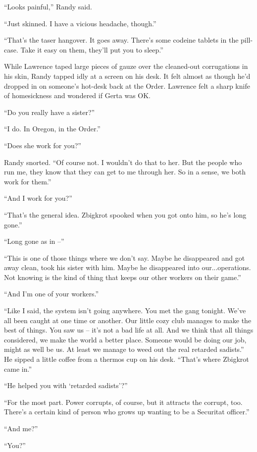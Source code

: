 “Looks painful,” Randy said.

“Just skinned. I have a vicious headache, though.”

“That's the taser hangover. It goes away. There's some codeine 
tablets in the pill-case. Take it easy on them, they'll put you to 
sleep.”

While Lawrence taped large pieces of gauze over the cleaned-out 
corrugations in his skin, Randy tapped idly at a screen on his desk. It 
felt almost as though he'd dropped in on someone's hot-desk back at the 
Order. Lawrence felt a sharp knife of homesickness and wondered if 
Gerta was OK.

“Do you really have a sister?”

“I do. In Oregon, in the Order.”

“Does she work for you?”

Randy snorted. “Of course not. I wouldn't do that to her. But the 
people who run me, they know that they can get to me through her. So in 
a sense, we both work for them.”

“And I work for you?”

“That's the general idea. Zbigkrot spooked when you got onto him, so 
he's long gone.”

“Long gone as in --”

“This is one of those things where we don't say. Maybe he disappeared 
and got away clean, took his sister with him. Maybe he disappeared into 
our...operations. Not knowing is the kind of thing that keeps our other 
workers on their game.”

“And I'm one of your workers.”

“Like I said, the system isn't going anywhere. You met the gang 
tonight. We've all been caught at one time or another. Our little cozy 
club manages to make the best of things. You saw us -- it's not a bad 
life at all. And we think that all things considered, we make the world 
a better place. Someone would be doing our job, might as well be us. At 
least we manage to weed out the real retarded sadists.” He sipped a 
little coffee from a thermos cup on his desk. “That's where Zbigkrot 
came in.”

“He helped you with `retarded sadists'?”

“For the most part. Power corrupts, of course, but it attracts the 
corrupt, too. There's a certain kind of person who grows up wanting to 
be a Securitat officer.”

“And me?”

“You?”

